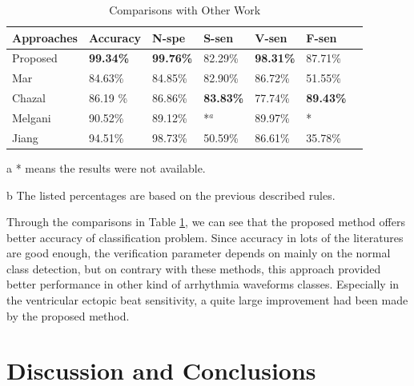 \documentclass[journal]{IEEEtran}
\begin{document}
\begin{table}[!htbp]
\begin{center}
\begin{threeparttable}
\caption{Comparisons with Other Work}
\label{table5}
\begin{tabular}{lllllll}
\hline

Approaches            &  Accuracy & N-spe & S-sen & V-sen & F-sen \\
\hline
 Proposed             & \textbf{99.34\%}  & \textbf{99.76\%} &  82.29\% & \textbf{98.31\%} & 87.71\% \\
 Mar\cite{mar}        & 84.63\%  & 84.85\% & 82.90\%  & 86.72\% & 51.55\% \\
 Chazal\cite{chaza}   & 86.19 \% & 86.86\% & \textbf{83.83\%}  & 77.74\% & \textbf{89.43\%} \\
 Melgani\cite{melgan} & 90.52\%  & 89.12\% & *$^a$    & 89.97\% & * \\
 Jiang \cite{jiang}   & 94.51\%  & 98.73\% & 50.59\%  & 86.61\% & 35.78\% \\
\hline
\end{tabular}
\begin{tablenotes}
\item [a] * means the results were not available.
\item [b] The listed percentages are based on the previous described rules.
\end{tablenotes}
\end{threeparttable}
\end{center}
\end{table}

Through the comparisons in Table \ref{table5}, we can see that the proposed method offers better accuracy of classification problem. Since accuracy in lots of the literatures are good enough, the verification parameter depends on mainly on the normal class detection, but on contrary with these methods, this approach provided better performance in other kind of arrhythmia waveforms classes. Especially in the ventricular ectopic beat sensitivity, a quite large improvement had been made by the proposed method.


\section{Discussion and Conclusions}
\end{document}
